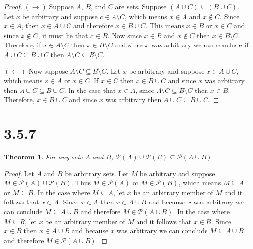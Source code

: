 \documentclass{article}
\newcommand{\pwset}{\mathscr{P}}
\newtheorem*{theorem}{Theorem}  %
\begin{document}
\begin{proof}
$(\rightarrow)$ Suppose $A$, $B$, and $C$ are sets. Suppose $(A \cup C) \subseteq (B \cup C)$. Let $x$ be arbitrary and suppose $c \in A \setminus C$, which means $x \in A$ and $x \notin C$. Since $x \in A$, then $x \in A \cup C$ and therefore $x \in B \cup C$. This means $x \in B$ or $x \in C$ and since $x \notin C$, it must be that $x \in B$. Now since $x \in B$ and $x \notin C$ then $x \in B \setminus C$. Therefore, if $x \in A \setminus C$ then $x \in B \setminus C$ and since $x$ was arbitrary we can conclude if $A \cup C \subseteq B \cup C$ then $A \setminus C \subseteq B \setminus C$.

$(\leftarrow)$ Now suppose $A \setminus C \subseteq B \setminus C$. Let $x$ be arbitrary and suppose $x \in A \cup C$, which means $x \in A$ or $x \in C$. If $x \in C$ then $x \in B \cup C$ and since $x$ was arbitrary then $A \cup C \subseteq B \cup C$. In the case that $x \in A$, since $A \setminus C \subseteq B \setminus C$ then $x \in B$. Therefore, $x \in B \cup C$ and since $x$ was arbitrary then $A \cup C \subseteq B \cup C$.  
\end{proof}

\section*{3.5.7}
\begin{theorem} For any sets $A$ and $B$, $\pwset (A) \cup \pwset (B) \subseteq \pwset (A \cup B)$
\end{theorem}

\begin{proof}
Let $A$ and $B$ be arbitrary sets. Let $M$ be arbitrary and suppose $M \in \pwset (A) \cup \pwset (B)$. Thus $M \in \pwset (A)$ or $M \in \pwset (B)$, which means $M \subseteq A$ or $M \subseteq B$. In the case where $M \subseteq A$, let $x$ be an arbitrary member of $M$ and it follows that $x \in A$. Since $x \in A$ then $x \in A \cup B$ and because $x$ was arbitrary we can conclude $M \subseteq A \cup B$ and therefore $M \in \pwset (A \cup B)$. In the case where $M \subseteq B$, let $x$ be an arbitrary member of $M$ and it follows that $x \in B$. Since $x \in B$ then $x \in A \cup B$ and because $x$ was arbitrary we can conclude $M \subseteq A \cup B$ and therefore $M \in \pwset (A \cup B)$.
\end{proof}
\end{document}
